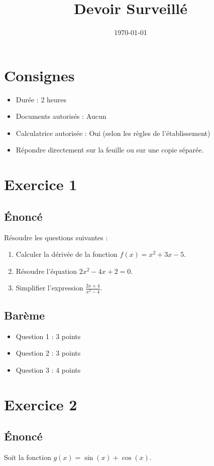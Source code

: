 \documentclass[12pt, a4paper]{article}
\title{Devoir Surveillé}
\author{}
\date{\today}
\begin{document}
\maketitle

\section*{Consignes}
\begin{itemize}
    \item Durée : 2 heures
    \item Documents autorisés : Aucun
    \item Calculatrice autorisée : Oui (selon les règles de l'établissement)
    \item Répondre directement sur la feuille ou sur une copie séparée.
\end{itemize}

\section*{Exercice 1}
\subsection*{Énoncé}
Résoudre les questions suivantes :

\begin{enumerate}
    \item Calculer la dérivée de la fonction $f(x) = x^2 + 3x - 5$.
    \item Résoudre l'équation $2x^2 - 4x + 2 = 0$.
    \item Simplifier l'expression $\frac{2x + 4}{x^2 - 4}$.
\end{enumerate}

\subsection*{Barème}
\begin{itemize}
    \item Question 1 : 3 points
    \item Question 2 : 3 points
    \item Question 3 : 4 points
\end{itemize}

\section*{Exercice 2}
\subsection*{Énoncé}
Soit la fonction $g(x) = \sin(x) + \cos(x)$. 
\end{document}
